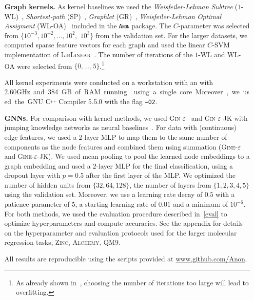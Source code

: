 \documentclass{article}
\newcommand{\xhdr}[1]{{\noindent\bfseries #1}}
\theoremstyle{definition}
\newcommand{\CC}[1][]{$\text{C\hspace{-.25ex}}^{_{_{_{++}}}}
	\ifthenelse{\equal{#1}{}}{}{\text{\hspace{-.625ex}#1}}$}
\newcommand{\new}[1]{\emph{#1}}
\begin{document}
\xhdr{Graph kernels.} As kernel baselines we used the \new{Weisfeiler-Lehman Subtree} (\textsc{$1$-WL})~\cite{She+2011}, \new{Shortest-path} (\textsc{SP})~\cite{Bor+2005}, \new{Graphlet} (\textsc{GR})~\cite{She+2009}, \new{Weisfeiler-Lehman Optimal Assigment} (\textsc{WL-OA})~\cite{Kri+2016} included in the \textsc{\texttt{Anon}} package. The $C$-parameter was selected from $\{10^{-3}, 10^{-2}, \dotsc, 10^{2},$ $10^{3}\}$ from the validation set. For the larger datasets, we computed sparse feature vectors for each graph and used the linear $C$-SVM implementation of \textsc{LibLinear}~\cite{Fan+2008}. The number of iterations of the \textsc{$1$-WL} and \textsc{WL-OA} were selected from $\{0,\dotsc,5\}$.\footnote{As already shown in~\cite{She+2011}, choosing the number of iterations too large will lead to overfitting.}

All kernel experiments were conducted on a workstation with an  with 2.60\si GHz and 384\si GB of RAM running  using a single core. Moreover, we used the GNU \CC Compiler 5.5.0 with the flag \texttt{--O2}. 

\xhdr{GNNs.} 
For comparison with kernel methods, we used \textsc{Gin-$\varepsilon$}~\cite{Xu+2018b} and \textsc{Gin-$\varepsilon$-JK} with jumping knowledge networks as neural baselines~\cite{Xu+2018}. For data with (continuous) edge features, we used a $2$-layer MLP to map them to the same number of components as the node features and combined them using summation (\textsc{Gine-$\varepsilon$} and \textsc{Gine-$\varepsilon$}-JK). We used mean pooling to pool the learned node embeddings to a graph embedding and used a $2$-layer MLP for the final classification, using a dropout layer with $p = 0.5$ after the first layer of the MLP. We optimized the number of hidden units from $
\{ 32, 64, 128\}$, the number of layers from $ \{1, 2, 3, 4, 5\}$ using the validation set. Moreover, we use a learning rate decay of $0.5$ with a patience parameter of $5$, a starting learning rate of $0.01$ and a minimum of $10^{-6}$. For both methods, we used the evaluation procedure described in~\cref{eval} to optimize hyperparameters and compute accuracies. See the appendix for details on the hyperparameter and evaluation protocols used for the larger molecular regression tasks, \textsc{Zinc}, \textsc{Alchemy},  \textsc{QM9}.

All results are reproducible using the scripts provided at \url{www.github.com/Anon}.
\end{document}
